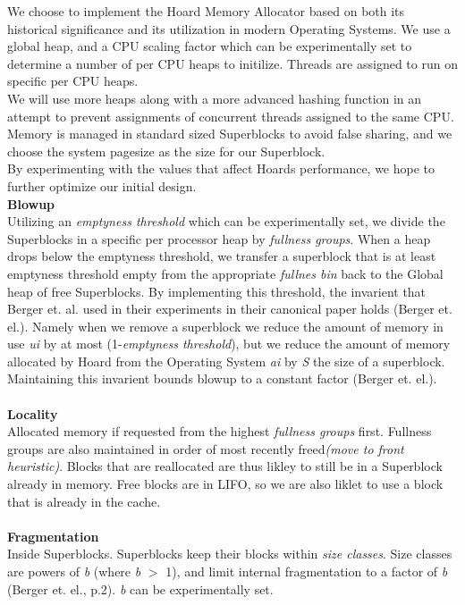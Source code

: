 \documentclass{article}
\begin{document}
\indent \indent We choose to implement the Hoard Memory Allocator based on both its historical significance and its utilization in modern Operating Systems.  We use a global heap, and a CPU scaling factor which can be experimentally set to determine a number of per CPU heaps to initilize.  Threads are assigned to run on specific per CPU heaps.  
\\
\indent We will use more heaps along with a more advanced hashing function in an attempt to prevent assignments of concurrent threads assigned to the same CPU.  Memory is managed in standard sized Superblocks to avoid false sharing, and we choose the system pagesize as the size for our Superblock.
\\
\indent By experimenting with the values that affect Hoards performance, we hope to further optimize our initial design.
\\
\newpage
\noindent
\textbf{Blowup}
\\
\indent  Utilizing an \textit{emptyness threshold} which can be experimentally set, we divide the Superblocks in a specific per processor heap by \textit{fullness groups}.  When a heap drops below the emptyness threshold, we transfer a superblock that is at least emptyness threshold empty from the appropriate \textit{fullnes bin} back to the Global heap of free Superblocks.  By implementing this threshold, the invarient that Berger et. al. used in their experiments in their canonical paper holds (Berger et. el.).  Namely when we remove a superblock we reduce the amount of memory in use \textit{ui} by at most (1-\textit{emptyness threshold}), but we reduce the amount of memory allocated by Hoard from the Operating System \textit{ai} by \textit{S} the size of a superblock.   Maintaining this invarient bounds blowup to a constant factor (Berger et. el.).  
\\
\\
\textbf{Locality}
\\
\indent Allocated memory if requested from the highest \textit{fullness groups} first.  Fullness groups are also maintained in order of most recently freed\textit{(move to front heuristic)}.  Blocks that are reallocated are thus likley to still be in a Superblock already in memory.  Free blocks are in LIFO, so we are also liklet to use a block that is already in the cache.
\\
\\
\textbf{Fragmentation}
\\
\indent Inside Superblocks.  Superblocks keep their blocks within \textit{size classes}.  Size classes are powers of \textit{b} (where \textit{b} $>$ 1), and limit internal fragmentation to a factor of \textit{b} (Berger et. el., p.2). \textit{b} can be experimentally set.  
\end{document}
